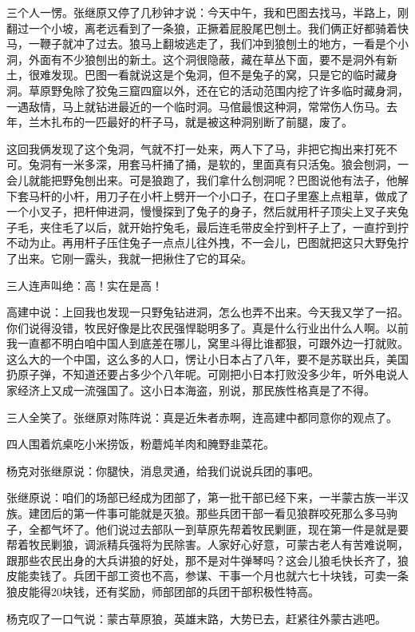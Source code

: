 \par 三个人一愣。张继原又停了几秒钟才说：今天中午，我和巴图去找马，半路上，刚翻过一个小坡，离老远看到了一条狼，正撅着屁股尾巴刨土。我们俩正好都骑着快马，一鞭子就冲了过去。狼马上翻坡逃走了，我们冲到狼刨土的地方，一看是个小洞，外面有不少狼刨出的新土。这个洞很隐蔽，藏在草丛下面，要不是洞外有新土，很难发现。巴图一看就说这是个兔洞，但不是兔子的窝，只是它的临时藏身洞。草原野兔除了狡兔三窟四窟以外，还在它的活动范围内挖了许多临时藏身洞，一遇敌情，马上就钻进最近的一个临时洞。马倌最恨这种洞，常常伤人伤马。去年，兰木扎布的一匹最好的杆子马，就是被这种洞别断了前腿，废了。
\par 这回我俩发现了这个兔洞，气就不打一处来，两人下了马，非把它掏出来打死不可。兔洞有一米多深，用套马杆捅了捅，是软的，里面真有只活兔。狼会刨洞，一会儿就能把野兔刨出来。可是狼跑了，我们拿什么刨洞呢？巴图说他有法子，他解下套马杆的小杆，用刀子在小杆上劈开一个小口子，在口子里塞上点粗草，做成了一个小叉子，把杆伸进洞，慢慢探到了兔子的身子，然后就用杆子顶尖上叉子夹兔子毛，夹住毛了以后，就开始拧兔毛，最后连毛带皮全拧到杆子上了，一直拧到拧不动为止。再用杆子压住兔子一点点儿往外拽，不一会儿，巴图就把这只大野兔拧了出来。它刚一露头，我就一把揪住了它的耳朵。
\par 三人连声叫绝：高！实在是高！
\par 高建中说：上回我也发现一只野兔钻进洞，怎么也弄不出来。今天我又学了一招。你们说得没错，牧民好像是比农民强悍聪明多了。真是什么行业出什么人啊。以前我一直都不明白咱中国人到底差在哪儿，窝里斗得比谁都狠，可跟外边一打就败。这么大的一个中国，这么多的人口，愣让小日本占了八年，要不是苏联出兵，美国扔原子弹，不知道还要占多少个八年呢。可刚把小日本打败没多少年，听外电说人家经济上又成一流强国了。这小日本海盗，别说，那民族性格真是了不得。
\par 三人全笑了。张继原对陈阵说：真是近朱者赤啊，连高建中都同意你的观点了。
\par 四人围着炕桌吃小米捞饭，粉蘑炖羊肉和腌野韭菜花。
\par 杨克对张继原说：你腿快，消息灵通，给我们说说兵团的事吧。
\par 张继原说：咱们的场部已经成为团部了，第一批干部已经下来，一半蒙古族一半汉族。建团后的第一件事可能就是灭狼。那些兵团干部一看见狼群咬死那么多马驹子，全都气坏了。他们说过去部队一到草原先帮着牧民剿匪，现在第一件是就是要帮着牧民剿狼，调派精兵强将为民除害。人家好心好意，可蒙古老人有苦难说啊，跟那些农民出身的大兵讲狼的好处，那不是对牛弹琴吗？这会儿狼毛快长齐了，狼皮能卖钱了。兵团干部工资也不高，参谋、干事一个月也就六七十块钱，可卖一条狼皮能得20块钱，还有奖励，师部团部的兵团干部积极性特高。
\par 杨克叹了一口气说：蒙古草原狼，英雄末路，大势已去，赶紧往外蒙古逃吧。





